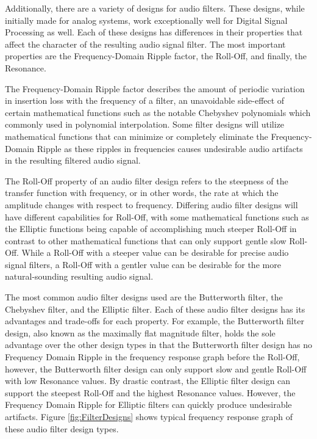 \documentclass[a4paper,12pt]{report}
\begin{document}
Additionally, there are a variety of designs for audio filters. These designs, while initially made for analog systems, work exceptionally well for Digital Signal Processing as well. Each of these designs has differences in their properties that affect the character of the resulting audio signal filter. The most important properties are the Frequency-Domain Ripple factor, the Roll-Off, and finally, the Resonance.

The Frequency-Domain Ripple factor describes the amount of periodic variation in insertion loss with the frequency of a filter, an unavoidable side-effect of certain mathematical functions such as the notable Chebyshev polynomials which commonly used in polynomial interpolation. Some filter designs will utilize mathematical functions that can minimize or completely eliminate the Frequency-Domain Ripple as these ripples in frequencies causes undesirable audio artifacts in the resulting filtered audio signal.

The Roll-Off property of an audio filter design refers to the steepness of the transfer function with frequency, or in other words, the rate at which the amplitude changes with respect to frequency.  Differing audio filter designs will have different capabilities for Roll-Off, with some mathematical functions such as the Elliptic functions being capable of accomplishing much steeper Roll-Off in contrast to other mathematical functions that can only support gentle slow Roll-Off. While a Roll-Off with a steeper value can be desirable for precise audio signal filters, a Roll-Off with a gentler value can be desirable for the more natural-sounding resulting audio signal.

The most common audio filter designs used are the Butterworth filter, the Chebyshev filter, and the Elliptic filter. Each of these audio filter designs has its advantages and trade-offs for each property. For example, the Butterworth filter design, also known as the maximally flat magnitude filter, holds the sole advantage over the other design types in that the Butterworth filter design has no Frequency Domain Ripple in the frequency response graph before the Roll-Off, however, the Butterworth filter design can only support slow and gentle Roll-Off with low Resonance values. By drastic contrast, the Elliptic filter design can support the steepest Roll-Off and the highest Resonance values. However, the Frequency Domain Ripple for Elliptic filters can quickly produce undesirable artifacts. Figure \ref{fig:FilterDesigns} shows typical frequency response graph of these audio filter design types.
\end{document}
